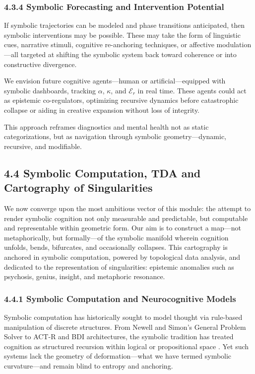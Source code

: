 \subsubsection*{4.3.4 Symbolic Forecasting and Intervention Potential}

If symbolic trajectories can be modeled and phase transitions anticipated, then symbolic interventions may be possible. These may take the form of linguistic cues, narrative stimuli, cognitive re-anchoring techniques, or affective modulation—all targeted at shifting the symbolic system back toward coherence or into constructive divergence.

We envision future cognitive agents—human or artificial—equipped with symbolic dashboards, tracking $\alpha$, $\kappa$, and $\mathcal{E}_r$ in real time. These agents could act as epistemic co-regulators, optimizing recursive dynamics before catastrophic collapse or aiding in creative expansion without loss of integrity.

This approach reframes diagnostics and mental health not as static categorizations, but as navigation through symbolic geometry—dynamic, recursive, and modifiable.
\subsection*{4.4 Symbolic Computation, TDA and Cartography of Singularities}

We now converge upon the most ambitious vector of this module: the attempt to render symbolic cognition not only measurable and predictable, but computable and representable within geometric form. Our aim is to construct a map—not metaphorically, but formally—of the symbolic manifold wherein cognition unfolds, bends, bifurcates, and occasionally collapses. This cartography is anchored in symbolic computation, powered by topological data analysis, and dedicated to the representation of singularities: epistemic anomalies such as psychosis, genius, insight, and metaphoric resonance.

\subsubsection*{4.4.1 Symbolic Computation and Neurocognitive Models}

Symbolic computation has historically sought to model thought via rule-based manipulation of discrete structures. From Newell and Simon’s General Problem Solver to ACT-R and BDI architectures, the symbolic tradition has treated cognition as structured recursion within logical or propositional space \cite{newell1980physical, anderson1996actr, rao1995bdi}. Yet such systems lack the geometry of deformation—what we have termed symbolic curvature—and remain blind to entropy and anchoring.

